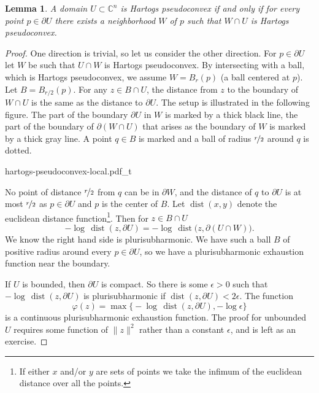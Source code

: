 \documentclass[12pt,openany]{book}
\newcommand{\snorm}[1]{\lVert {#1} \rVert}
\newcommand{\C}{{\mathbb{C}}}
\theoremstyle{plain}
\newtheorem{lemma}[thm]{Lemma}
\theoremstyle{remark}
\theoremstyle{definition}
\theoremstyle{exercise}
\theoremstyle{example}
\begin{document}
\begin{lemma}
A domain $U \subset \C^n$ is Hartogs pseudoconvex if and only if
for every point $p \in \partial U$ there exists a neighborhood $W$ of $p$
such that $W \cap U$ is Hartogs pseudoconvex.
\end{lemma}

\begin{proof}
One direction is trivial,
so let us consider the other direction.  For $p \in \partial U$ let
$W$ be such that $U \cap W$
is Hartogs pseudoconvex.  By intersecting with a ball, which is
Hartogs pseudoconvex, we assume $W = B_r(p)$ (a ball centered at $p$).
Let $B = B_{r/2}(p)$.  For
any $z \in B \cap U$, the distance from $z$ to the boundary of $W \cap U$ is the same as
the distance to $\partial U$.  The setup is illustrated in the following
figure.  The part of the boundary $\partial U$ in $W$ is marked by a thick
black line, the part of the boundary of $\partial (W \cap U)$ that arises as
the boundary of $W$ is marked by a thick gray line.  A point $q \in B$ is
marked and a ball of radius $\nicefrac{r}{2}$ around $q$ is dotted.

\begin{center}
{hartogs-pseudoconvex-local.pdf_t}
\end{center}

No point of distance $\nicefrac{r}{2}$ from $q$ can be in $\partial W$, and 
the distance of $q$ to $\partial U$ is at most $\nicefrac{r}{2}$ as $p \in \partial U$
and $p$ is the center of $B$.
%
Let $\operatorname{dist}(x,y)$ denote the
euclidean distance function\footnote{If either $x$ and/or $y$ are sets
of points we take the infimum of the euclidean distance over all the points.}.
Then for $z \in B \cap U$
\begin{equation*}
- \log \, \operatorname{dist}(z, \partial U) = 
- \log \, \operatorname{dist}\bigl(z, \partial (U \cap W)\bigr).
\end{equation*}
We know the right hand side is plurisubharmonic.  We have such a ball $B$ of
positive radius around every $p \in \partial U$, so we have a
plurisubharmonic
exhaustion function near the boundary.

If $U$ is bounded, then $\partial U$ is compact.  So there is some
$\epsilon > 0$ such that $- \log \, \operatorname{dist}(z, \partial U)$
is plurisubharmonic if $\operatorname{dist}(z, \partial U) < 2\epsilon$.
The function
\begin{equation*}
\varphi(z) = \max \bigl\{
- \log \, \operatorname{dist}(z, \partial U) , - \log \epsilon \bigr\} 
\end{equation*}
is a continuous plurisubharmonic exhaustion function.  The proof for
unbounded $U$ requires some function of $\snorm{z}^2$ rather than a constant
$\epsilon$,
and is left as an exercise.
\end{proof}
\end{document}

